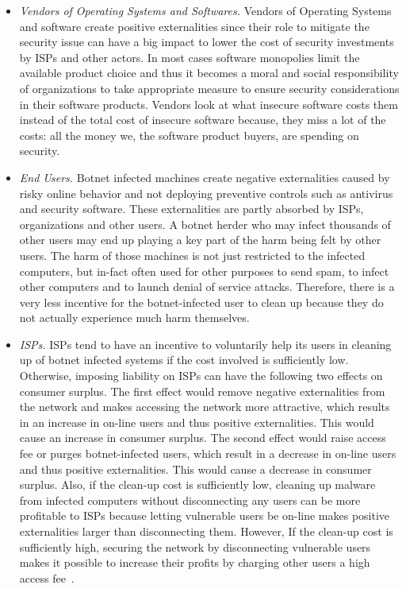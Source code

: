 \begin{itemize}
\item \textit{Vendors of Operating Systems and Softwares. } Vendors of Operating Systems and software create positive externalities since their role to mitigate the security issue can have a big impact to lower the cost of security investments by ISPs and other actors. In most cases software monopolies limit the available product choice and thus it becomes a moral and social responsibility of organizations to take appropriate measure to ensure security considerations in their software products. Vendors look at what insecure software costs them instead of the total cost of insecure software because, they miss a lot of the costs: all the money we, the software product buyers, are spending on security.
\item \textit{End Users.} Botnet infected machines create negative externalities caused by risky online behavior and not deploying preventive controls such as antivirus and security software. These externalities are partly absorbed by ISPs, organizations and other users. A botnet herder who may infect thousands of other users may end up playing a key part of the harm being felt by other users. The harm of those machines is not just restricted to the infected computers, but in-fact often used for other purposes to send spam, to infect other computers and to launch denial of service attacks. Therefore, there is a very less incentive for the botnet-infected user to clean up because they do not actually experience much harm themselves.




\item \textit{ISPs.} ISPs tend to have an incentive to voluntarily help its users in cleaning up of botnet infected systems if the cost involved is sufficiently low. Otherwise, imposing liability on ISPs can have the following two effects on consumer surplus. The first effect would remove negative externalities from the network and makes accessing the network more attractive, which results in an increase in on-line users and thus positive externalities. This would cause an increase in consumer surplus. The second effect would raise access fee or purges botnet-infected users, which result in a decrease in on-line users and thus positive externalities. This would cause a decrease in consumer surplus. Also, if the clean-up cost is sufficiently low, cleaning up malware from infected computers without disconnecting any users can be more profitable to ISPs because letting vulnerable users be on-line makes positive externalities larger than disconnecting them. However, If the clean-up cost is sufficiently high, securing the network by disconnecting vulnerable users makes it possible to increase their profits by charging other users a high access fee~\cite{kinukawa2012should}.


\end{itemize}
